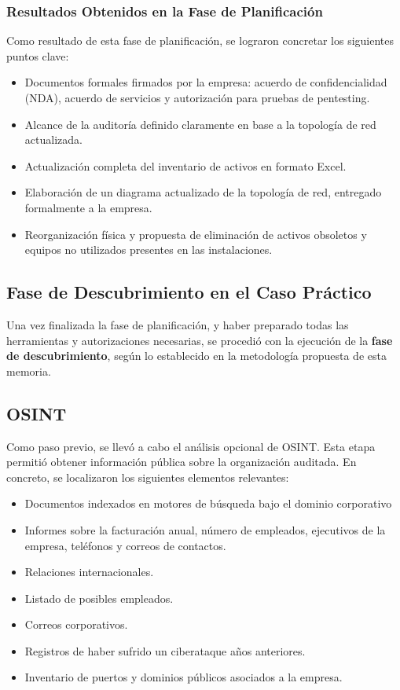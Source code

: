 \documentclass[a4paper, 11pt]{article}
\begin{document}
\subsubsection{Resultados Obtenidos en la Fase de Planificación}

Como resultado de esta fase de planificación, se lograron concretar los siguientes puntos clave:

\begin{itemize}
    \item Documentos formales firmados por la empresa: acuerdo de confidencialidad (NDA), acuerdo de servicios y autorización para pruebas de pentesting.
    \item Alcance de la auditoría definido claramente en base a la topología de red actualizada.
    \item Actualización completa del inventario de activos en formato Excel.
    \item Elaboración de un diagrama actualizado de la topología de red, entregado formalmente a la empresa.
    \item Reorganización física y propuesta de eliminación de activos obsoletos y equipos no utilizados presentes en las instalaciones.
\end{itemize}



\subsection{Fase de Descubrimiento en el Caso Práctico}

Una vez finalizada la fase de planificación, y haber preparado todas las herramientas y autorizaciones necesarias, se procedió con la ejecución de la \textbf{fase de descubrimiento}, según lo establecido en la metodología propuesta de esta memoria.


\subsection*{OSINT}

Como paso previo, se llevó a cabo el análisis opcional de OSINT. Esta etapa permitió obtener información pública sobre la organización auditada. En concreto, se localizaron los siguientes elementos relevantes:

\begin{itemize}
    \item Documentos indexados en motores de búsqueda bajo el dominio corporativo
    \item Informes sobre la facturación anual, número de empleados, ejecutivos de la empresa, teléfonos y correos de contactos.
    \item Relaciones internacionales.
    \item Listado de posibles empleados.
    \item Correos corporativos.
    \item Registros de haber sufrido un ciberataque años anteriores.
    \item Inventario de puertos y dominios públicos asociados a la empresa.
\end{itemize}
\end{document}
